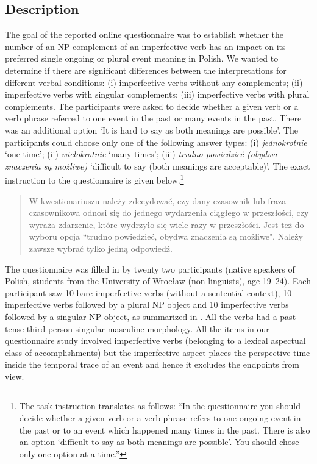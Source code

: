 \documentclass[output=paper]{langscibook}
\begin{document}
\subsection{Description}\label{jan-bla:fansb:kb:sec3.1}

The goal of the reported online questionnaire was to establish whether the number of an NP complement of an imperfective verb has an impact on its preferred single ongoing or plural event meaning in Polish. We wanted to determine if there are significant differences between the interpretations for different verbal conditions: (i) imperfective verbs without any complements; (ii) imperfective verbs with singular complements; (iii) imperfective verbs with plural complements. The participants were asked to decide whether a given verb or a verb phrase referred to one event in the past or many events in the past. There was an additional option ‘It is hard to say as both meanings are possible’. The participants could choose only one of the following answer types: (i) \textit{jednokrotnie} ‘one time’; (ii) \textit{wielokrotnie} ‘many times’; (iii) \textit{trudno powiedzieć (obydwa znaczenia są możliwe)} ‘difficult to say (both meanings are acceptable)’. The exact instruction to the questionnaire is given below.\footnote{The task instruction translates as follows: 
``In the questionnaire you should decide whether a given verb or a verb phrase refers to one ongoing event in the past or to an event which happened many times in the past. There is also an option ‘difficult to say as both meanings are possible’. You should chose only one option at a time.''}

\begin{quote}
W kwestionariuszu należy zdecydować, czy dany czasownik lub fraza czasownikowa odnosi się do jednego wydarzenia ciągłego w przeszłości, czy wyraża zdarzenie, które wydrzyło się wiele razy w przeszłości. Jest też do wyboru opcja ``trudno powiedzieć, obydwa znaczenia są możliwe". Należy zawsze wybrać tylko jedną odpowiedź.
\end{quote}

The questionnaire was filled in by twenty two participants (native speakers of Polish, students from the University of Wrocław (non-linguists), age 19--24). Each participant saw 10 bare imperfective verbs (without a sentential context), 10 imperfective verbs followed by a plural NP object and 10 imperfective verbs followed by a singular NP object, as summarized in . All the verbs had a past tense third person singular masculine morphology. All the items in our questionnaire study involved imperfective verbs (belonging to a lexical aspectual class of accomplishments) but the imperfective aspect places the perspective time inside the temporal trace of an event and hence it excludes the endpoints from view. 
\end{document}

